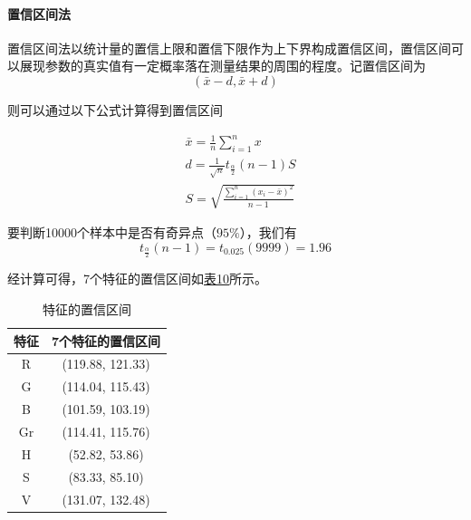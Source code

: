 \documentclass[UTF8]{ctexart}
\begin{document}
	
	\paragraph{置信区间法} 置信区间法以统计量的置信上限和置信下限作为上下界构成置信区间，置信区间可以展现参数的真实值有一定概率落在测量结果的周围的程度。记置信区间为
	\begin{equation*}
	(\bar{x} - d, \bar{x} + d)
	\end{equation*}
	
	则可以通过以下公式计算得到置信区间
	
	\begin{align*}
	&\bar{x} = \frac{1}{n}\sum_{i=1}^{n} x \\
	&d = \frac{1}{\sqrt{n}}t_{\frac{\alpha}{2}}(n - 1)S \\	
	&S = \sqrt{\frac{\sum\limits_{i=1}^{n}(x_i - \bar{x})^2}{n - 1}}		
	\end{align*}

	要判断10000个样本中是否有奇异点（$95\%$），我们有
	\begin{equation*}
	t_{\frac{\alpha}{2}}(n - 1) = t_{0.025}(9999) = 1.96
	\end{equation*}
	
	经计算可得，7个特征的置信区间如\hyperref[Chart.10]{表10}所示。
	
	\begin{table}[htbp]
		\centering
		\caption{特征的置信区间}
		\begin{tabular}{cc}
			\toprule
			特征 & 7个特征的置信区间 \\
			\midrule
			R & (119.88, 121.33) \\
			\midrule
			G & (114.04, 115.43) \\
			\midrule
			B & (101.59, 103.19) \\
			\midrule
			Gr & (114.41, 115.76) \\
			\midrule
			H & (52.82, 53.86) \\
			\midrule
			S & (83.33, 85.10) \\
			\midrule
			V & (131.07, 132.48) \\
			\bottomrule
		\end{tabular}%
		\label{Chart.10}%
	\end{table}%
	
\end{document}
